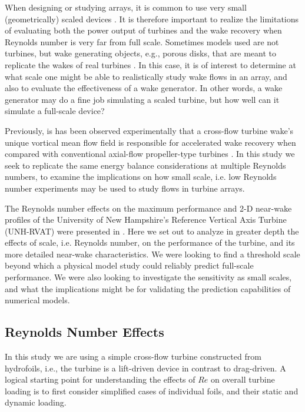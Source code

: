 \documentclass[energies,article,accept,moreauthors,pdftex,12pt,a4paper]{mdpi}
\begin{document}

When designing or studying arrays, it is common to use very small
(geometrically) scaled devices \cite{Chamorro2011, Chamorro2011b}. It is
therefore important to realize the limitations of evaluating both the power
output of turbines and the wake recovery when Reynolds number is very far from
full scale. Sometimes models used are not turbines, but wake generating objects,
e.g., porous disks, that are meant to replicate the wakes of real turbines
\cite{Goldenberg1983}. In this case, it is of interest to determine at what
scale one might be able to realistically study wake flows in an array, and also
to evaluate the effectiveness of a wake generator. In other words, a wake
generator may do a fine job simulating a scaled turbine, but how well can it
simulate a full-scale device?

Previously, is has been observed experimentally that a cross-flow turbine wake's
unique vortical mean flow field is responsible for accelerated wake recovery
when compared with conventional axial-flow propeller-type turbines
\cite{Bachant2015-JoT}. In this study we seek to replicate the same energy
balance considerations at multiple Reynolds numbers, to examine the implications
on how small scale, i.e. low Reynolds number experiments may be used to study
flows in turbine arrays.

The Reynolds number effects on the maximum performance and 2-D near-wake
profiles of the University of New Hampshire's Reference Vertical Axis Turbine
(UNH-RVAT) were presented in \cite{Bachant2014}. Here we set out to
analyze in greater depth the effects of scale, i.e. Reynolds number, on the
performance of the turbine, and its more detailed near-wake characteristics. We
were looking to find a threshold scale beyond which a physical model study could
reliably predict full-scale performance. We were also looking to investigate the
sensitivity as small scales, and what the implications might be for validating
the prediction capabilities of numerical models.



\subsection{Reynolds Number Effects}

In this study we are using a simple cross-flow turbine constructed from
hydrofoils, i.e., the
turbine is a lift-driven device in contrast to drag-driven. A logical starting
point for understanding the effects of $Re$ on overall turbine loading is to
first consider simplified cases of individual foils, and their static and
dynamic loading.
\end{document}
